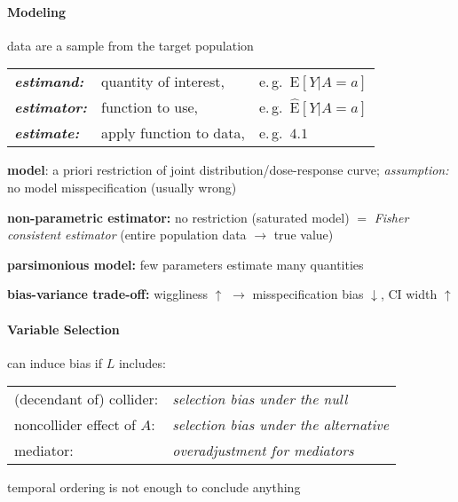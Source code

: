 \documentclass[8pt,twoside]{extarticle}
\begin{document}
\begin{multicols}{2}

\paragraph{Modeling} data are a sample from the target population \vspace{0.4em}

\noindent \hspace{0.9em}\begin{tabular}{l l l}
\textbf{\it estimand:} & quantity  of interest, & e.\,g.\ $\mathrm{E}\left[Y|A=a\right]$ \\
\textbf{\it estimator:} & function to use, & e.\,g.\ $\widehat{\mathrm{E}}\left[Y|A=a\right]$ \\
\textbf{\it estimate:} & apply function to data, & e.\,g.\ $4.1$ 
\end{tabular} \vspace{0.5em}

\noindent \textbf{model}: a priori restriction of joint distribution/dose-response curve;  \textit{assumption:} no model misspecification (usually wrong)

\noindent \textbf{non-parametric estimator:} no restriction (saturated model) $=$ \textit{Fisher consistent estimator} (entire population data $\rightarrow$ true value)

\noindent \textbf{parsimonious model:} few parameters estimate many quantities

\noindent \textbf{bias-variance trade-off:} \newline wiggliness $\uparrow$ $\rightarrow$ misspecification bias $\downarrow$, CI width $\uparrow$

\paragraph{Variable Selection} can induce bias if $L$ includes: 

\hspace{-0.2em}\vspace{-1em}
\begin{tabular}{l l }
 (decendant of) collider:& \textit{selection bias under the null}\\
 noncollider effect of $A$:& \textit{selection bias under the alternative}\\
 mediator:& \textit{overadjustment for mediators}
\end{tabular}

\noindent temporal ordering is not enough to conclude anything


\end{multicols}
\end{document}
